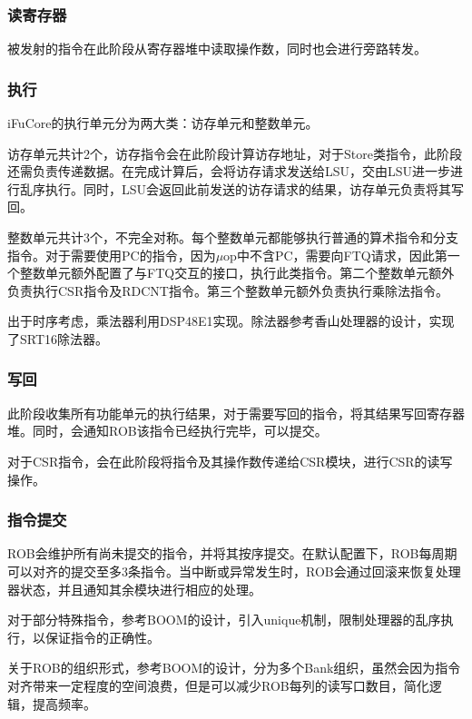 \documentclass{article}
\begin{document}
\subsubsection{读寄存器}
被发射的指令在此阶段从寄存器堆中读取操作数，同时也会进行旁路转发。

\subsubsection{执行}
iFuCore的执行单元分为两大类：访存单元和整数单元。\par
访存单元共计2个，访存指令会在此阶段计算访存地址，对于Store类指令，此阶段还需负责传递数据。在完成计算后，会将访存请求发送给LSU，交由LSU进一步进行乱序执行。同时，LSU会返回此前发送的访存请求的结果，访存单元负责将其写回。\par
整数单元共计3个，不完全对称。每个整数单元都能够执行普通的算术指令和分支指令。对于需要使用PC的指令，因为$\mu$op中不含PC，需要向FTQ请求，因此第一个整数单元额外配置了与FTQ交互的接口，执行此类指令。第二个整数单元额外负责执行CSR指令及RDCNT指令。第三个整数单元额外负责执行乘除法指令。\par
出于时序考虑，乘法器利用DSP48E1实现。除法器参考香山处理器的设计，实现了SRT16除法器。\par

\subsubsection{写回}
此阶段收集所有功能单元的执行结果，对于需要写回的指令，将其结果写回寄存器堆。同时，会通知ROB该指令已经执行完毕，可以提交。\par
对于CSR指令，会在此阶段将指令及其操作数传递给CSR模块，进行CSR的读写操作。\par

\subsubsection{指令提交}
ROB会维护所有尚未提交的指令，并将其按序提交。在默认配置下，ROB每周期可以对齐的提交至多3条指令。当中断或异常发生时，ROB会通过回滚来恢复处理器状态，并且通知其余模块进行相应的处理。\par
对于部分特殊指令，参考BOOM的设计，引入unique机制，限制处理器的乱序执行，以保证指令的正确性。\par
关于ROB的组织形式，参考BOOM的设计，分为多个Bank组织，虽然会因为指令对齐带来一定程度的空间浪费，但是可以减少ROB每列的读写口数目，简化逻辑，提高频率。\par
\end{document}
